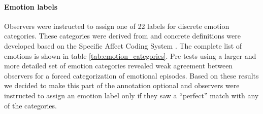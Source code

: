 \paragraph{Emotion labels}

Observers were instructed to assign one of 22 labels for discrete emotion
categories. These categories were derived from \cite{Ort1990} and concrete
definitions were developed based on the Specific Affect Coding System
\cite{CG2007}. The complete list of emotions is shown in table
\ref{tab:emotion_categories}.  Pre-tests using a larger and more detailed set
of emotion categories revealed weak agreement between observers for a forced
categorization of emotional episodes. Based on these results we decided to make
this part of the annotation optional and observers were instructed to assign an
emotion label only if they saw a ``perfect'' match with any of the categories.

